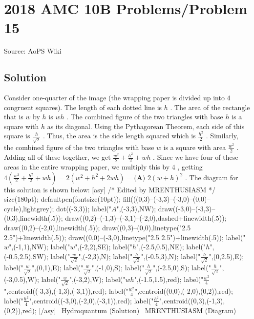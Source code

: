 \documentclass[12pt]{article}
\begin{document}
\section*{{2018 AMC 10B Problems/Problem 15}}
Source: AoPS Wiki

\subsection*{Solution}
Consider one-quarter of the image (the wrapping paper is divided up into $4$ congruent squares). The length of each dotted line is $h$ . The area of the rectangle that is $w$ by $h$ is $wh$ . The combined figure of the two triangles with base $h$ is a square with $h$ as its diagonal. Using the Pythagorean Theorem, each side of this square is $\frac{h}{\sqrt2}$ . Thus, the area is the side length squared which is $\frac{h^2}{2}$ . Similarly, the combined figure of the two triangles with base $w$ is a square with area $\frac{w^2}{2}$ . Adding all of these together, we get $\frac{w^2}{2} + \frac{h^2}{2} + wh$ . Since we have four of these areas in the entire wrapping paper, we multiply this by $4$ , getting $4\left(\frac{w^2}{2} + \frac{h^2}{2} + wh\right) = 2\left(w^2 + h^2 + 2wh\right) = \boxed{\textbf{(A) } 2(w+h)^2}$ . The diagram for this solution is shown below: [asy] /* Edited by MRENTHUSIASM */ size(180pt); defaultpen(fontsize(10pt)); fill(((0,3)--(-3,3)--(-3,0)--(0,0)--cycle),lightgrey); dot((-3,3)); label("$A$",(-3,3),NW); draw((-3,0)--(-3,3)--(0,3),linewidth(.5)); draw((0,2)--(-1,3)--(-3,1)--(-2,0),dashed+linewidth(.5)); draw((0,2)--(-2,0),linewidth(.5)); draw((0,3)--(0,0),linetype("2.5 2.5")+linewidth(.5)); draw((0,0)--(-3,0),linetype("2.5 2.5")+linewidth(.5)); label("$w$",(-1,1),NW); label("$w$",(-2,2),SE); label("$h$",(-2.5,0.5),NE); label("$h$",(-0.5,2.5),SW); label("$\frac{w}{\sqrt{2}}$",(-2,3),N); label("$\frac{h}{\sqrt{2}}$",(-0.5,3),N); label("$\frac{h}{\sqrt{2}}$",(0,2.5),E); label("$\frac{w}{\sqrt{2}}$",(0,1),E); label("$\frac{w}{\sqrt{2}}$",(-1,0),S); label("$\frac{h}{\sqrt{2}}$",(-2.5,0),S); label("$\frac{h}{\sqrt{2}}$",(-3,0.5),W); label("$\frac{w}{\sqrt{2}}$",(-3,2),W); label("$wh$",(-1.5,1.5),red); label("$\frac{w^2}{4}$",centroid((-3,3),(-1,3),(-3,1)),red); label("$\frac{w^2}{4}$",centroid((0,0),(-2,0),(0,2)),red); label("$\frac{h^2}{4}$",centroid((-3,0),(-2,0),(-3,1)),red); label("$\frac{h^2}{4}$",centroid((0,3),(-1,3),(0,2)),red); [/asy] ~Hydroquantum (Solution) ~MRENTHUSIASM (Diagram)
\end{document}
